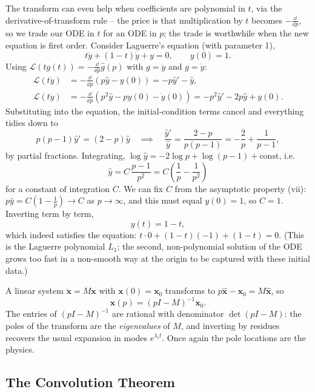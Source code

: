 \begin{example}
	The transform can even help when coefficients are polynomial in $t$, via the derivative-of-transform rule -- the price is that multiplication by $t$ becomes $-\frac{\dd}{\dd p}$, so we trade our ODE in $t$ for an ODE in $p$; the trade is worthwhile when the new equation is first order. Consider Laguerre's equation (with parameter 1),
	$$
	t \ddot y + (1 - t) \dot y + y = 0, \qquad y(0) = 1.
	$$
	Using $\mathcal L(t g(t)) = -\frac{\dd}{\dd p}\hat g(p)$ with $g = \ddot y$ and $g = \dot y$:
	\begin{align*}
	\mathcal L(t\dot y) &= -\frac{\dd}{\dd p}(p\hat y - y(0)) = -p \hat y' - \hat y, \\
	\mathcal L(t \ddot y) &= -\frac{\dd}{\dd p}\left(p^2 \hat y - p y(0) - \dot y(0)\right) = -p^2 \hat y' - 2p\hat y + y(0).
	\end{align*}
	Substituting into the equation, the initial-condition terms cancel and everything tidies down to
	$$
	p(p - 1)\hat y' = (2 - p) \hat y \quad\implies\quad \frac{\hat y'}{\hat y} = \frac{2 - p}{p(p-1)} = -\frac{2}{p} + \frac{1}{p - 1},
	$$
	by partial fractions. Integrating, $\log \hat y = -2\log p + \log(p - 1) + \text{const}$, i.e.
	$$
	\hat y = C\, \frac{p - 1}{p^2} = C\left(\frac 1p - \frac{1}{p^2}\right)
	$$
	for a constant of integration $C$. We can fix $C$ from the asymptotic property (vii): $p \hat y = C(1 - \frac 1p) \to C$ as $p \to \infty$, and this must equal $y(0) = 1$, so $C = 1$. Inverting term by term,
	$$
	y(t) = 1 - t,
	$$
	which indeed satisfies the equation: $t \cdot 0 + (1 - t)(-1) + (1 - t) = 0$. (This is the Laguerre polynomial $L_1$; the second, non-polynomial solution of the ODE grows too fast in a non-smooth way at the origin to be captured with these initial data.)
\end{example}

\begin{example}
	A linear system $\dot{\mathbf x} = M \mathbf x$ with $\mathbf x(0) = \mathbf x_0$ transforms to $p \hat{\mathbf x} - \mathbf x_0 = M \hat{\mathbf x}$, so
	$$
	\hat{\mathbf x}(p) = (pI - M)^{-1} \mathbf x_0.
	$$
	The entries of $(pI - M)^{-1}$ are rational with denominator $\det(pI - M)$: the poles of the transform are the \emph{eigenvalues} of $M$, and inverting by residues recovers the usual expansion in modes $e^{\lambda_i t}$. Once again the pole locations are the physics.
\end{example}

\subsection{The Convolution Theorem}

